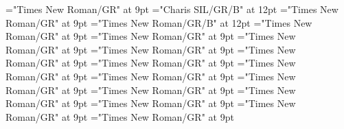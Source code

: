 \documentclass[gps1,twoside]{article}
\begin{document}
\font\configtargetconfigtargetconfigtargetslexsensereferencelexsensereferencessensesensessensesensessubentrysubentriesentrybefore="Times New Roman/GR" at 9pt
\font\spanbzhheadwordconfigtargetconfigtargetslexsensereferencelexsensereferencessensesensessensesensessubentrysubentriesentry="Charis SIL/GR/B" at 12pt
\font\spanspanheadwordconfigtargetconfigtargetslexsensereferencelexsensereferencessensesensessensesensessubentrysubentriesentrybefore="Times New Roman/GR" at 9pt
\font\spanheadwordconfigtargetconfigtargetslexsensereferencelexsensereferencessensesensessensesensessubentrysubentriesentry="Times New Roman/GR/B" at 12pt
\font\variantformentrybackrefvariantformentrybackrefvariantformentrybackrefssensesensessensesensessubentrysubentriesentrybefore="Times New Roman/GR" at 9pt
\font\variantformentrybackrefssensesensessensesensessubentrysubentriesentrybefore="Times New Roman/GR" at 9pt
\font\variantformentrybackrefssensesensessensesensessubentrysubentriesentryafter="Times New Roman/GR" at 9pt
\font\variantentrytypevariantentrytypevariantentrytypesvariantformentrybackrefvariantformentrybackrefssensesensessensesensessubentrysubentriesentrybefore="Times New Roman/GR" at 9pt
\font\variantentrytypesvariantformentrybackrefvariantformentrybackrefssensesensessensesensessubentrysubentriesentryafter="Times New Roman/GR" at 9pt
\font\spanspanreverseabbrvariantentrytypevariantentrytypesvariantformentrybackrefvariantformentrybackrefssensesensessensesensessubentrysubentriesentrybefore="Times New Roman/GR" at 9pt
\font\spanreverseabbrvariantentrytypevariantentrytypesvariantformentrybackrefvariantformentrybackrefssensesensessensesensessubentrysubentriesentrylastchildafter="Times New Roman/GR" at 9pt
\font\spanspanheadwordvariantformentrybackrefvariantformentrybackrefssensesensessensesensessubentrysubentriesentrybefore="Times New Roman/GR" at 9pt
\font\spanspanowningentrysummarydefinitionvariantformentrybackrefvariantformentrybackrefssensesensessensesensessubentrysubentriesentrybefore="Times New Roman/GR" at 9pt
\font\spanowningentrysummarydefinitionvariantformentrybackrefvariantformentrybackrefssensesensessensesensessubentrysubentriesentrylastchildafter="Times New Roman/GR" at 9pt
\font\scientificnamesensesensessensesensessubentrysubentriesentryafter="Times New Roman/GR" at 9pt
\font\semanticdomainsemanticdomainsemanticdomainssensesensessensesensessubentrysubentriesentrybefore="Times New Roman/GR" at 9pt
\font\semanticdomainssensesensessensesensessubentrysubentriesentrybefore="Times New Roman/GR" at 9pt
\font\semanticdomainssensesensessensesensessubentrysubentriesentryafter="Times New Roman/GR" at 9pt
\end{document}
